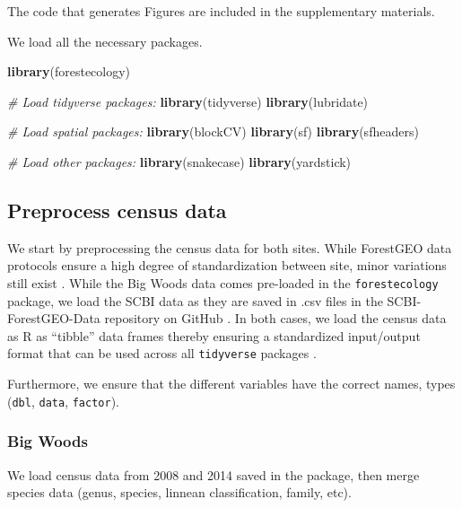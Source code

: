 \documentclass[12pt]{article}
\newenvironment{Shaded}{\begin{snugshade}}{\end{snugshade}}
\newcommand{\CommentTok}[1]{\textcolor[rgb]{0.56,0.35,0.01}{\textit{#1}}}
\newcommand{\KeywordTok}[1]{\textcolor[rgb]{0.13,0.29,0.53}{\textbf{#1}}}
\newcommand{\NormalTok}[1]{#1}
\begin{document}
The code that generates Figures are included in the supplementary
materials.

We load all the necessary packages.

\begin{Shaded}
\begin{Highlighting}[]
\KeywordTok{library}\NormalTok{(forestecology)}

\CommentTok{# Load tidyverse packages:}
\KeywordTok{library}\NormalTok{(tidyverse)}
\KeywordTok{library}\NormalTok{(lubridate)}

\CommentTok{# Load spatial packages:}
\KeywordTok{library}\NormalTok{(blockCV)}
\KeywordTok{library}\NormalTok{(sf)}
\KeywordTok{library}\NormalTok{(sfheaders)}

\CommentTok{# Load other packages:}
\KeywordTok{library}\NormalTok{(snakecase)}
\KeywordTok{library}\NormalTok{(yardstick)}
\end{Highlighting}
\end{Shaded}

\hypertarget{preprocess-census-data}{%
\subsection{Preprocess census data}\label{preprocess-census-data}}

We start by preprocessing the census data for both sites. While
ForestGEO data protocols ensure a high degree of standardization between
site, minor variations still exist
\citet{andersonteixeira_ctfs-forestgeo_2015}. While the Big Woods data
comes pre-loaded in the \texttt{forestecology} package, we load the SCBI
data as they are saved in .csv files in the SCBI-ForestGEO-Data
repository on GitHub
\citet{gonzalez-akre_scbi-forestgeoscbi-forestgeo-data_2020}. In both
cases, we load the census data as R as ``tibble'' data frames thereby
ensuring a standardized input/output format that can be used across all
\texttt{tidyverse} packages \citet{wickham_welcome_2019}.

Furthermore, we ensure that the different variables have the correct
names, types (\texttt{dbl}, \texttt{data}, \texttt{factor}).

\hypertarget{big-woods}{%
\subsubsection{Big Woods}\label{big-woods}}

We load census data from 2008 and 2014 saved in the package, then merge
species data (genus, species, linnean classification, family, etc).
\end{document}
